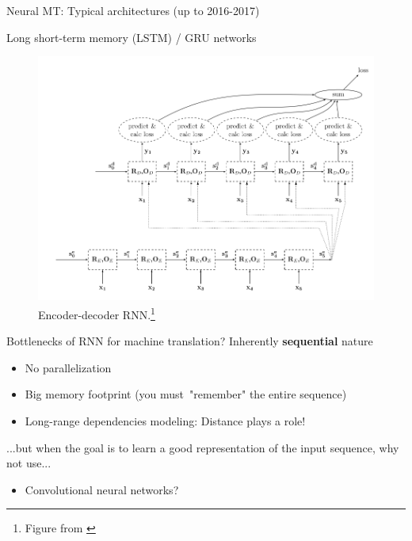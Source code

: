 \documentclass[12pt]{beamer}
\begin{document}
\begin{frame}{Neural MT: Typical architectures (up to 2016-2017)}
		
Long short-term memory (LSTM) / GRU networks


\begin{figure}
	\includegraphics[width=0.65\linewidth]{img/end-dec.png}
	\caption{Encoder-decoder RNN.\footnote{Figure from \citep{Goldberg.2016}}}
\end{figure}
\end{frame}


\begin{frame}{Bottlenecks of RNN for machine translation?}
Inherently \textbf{sequential} nature

\begin{itemize}
	\item No parallelization
	\item Big memory footprint (you must "remember" the entire sequence)
	\item Long-range dependencies modeling: Distance plays a role!
\end{itemize}

...but when the goal is to learn a good representation of the input sequence, why not use...

\begin{itemize}
	\item Convolutional neural networks?
\end{itemize}
	
\end{frame}
\end{document}
